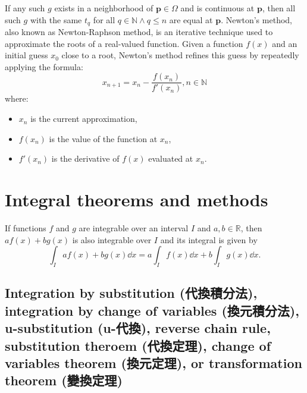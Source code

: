 \documentclass[a4paper,12pt]{report}
\begin{document}
\begin{itemize}
\begin{itemize}
If any such $g$ exists in a neighborhood of $\mathbf{p}\in\Omega$ and is continuous at $\mathbf{p}$, then all such $g$ with the same $t_q$ for all $q\in\mathbb{N}\land q\leq n$ are equal at $\mathbf{p}$.
Newton's method, also known as Newton-Raphson method, is an iterative technique used to approximate the roots of a real-valued function. Given a function $f(x)$ and an initial guess \( x_0 \) close to a root, Newton's method refines this guess by repeatedly applying the formula:
\[
x_{n+1} = x_n - \frac{f(x_n)}{f'(x_n)},n\in\mathbb{N}
\]
where:
\begin{itemize}
\item \( x_n \) is the current approximation,
\item \( f(x_n) \) is the value of the function at \( x_n \),
\item \( f'(x_n) \) is the derivative of \( f(x) \) evaluated at \( x_n \).
\end{itemize}



\section{Integral theorems and methods}
If functions $f$ and $g$ are integrable over an interval $I$ and $a,b\in\mathbb{R}$, then $af(x)+bg(x)$ is also integrable over $I$ and its integral is given by
\[\int_Iaf(x)+bg(x)\dd{x}=a\int_If(x)\dd{x}+b\int_Ig(x)\dd{x}.\]
\subsection{Integration by substitution (代換積分法), integration by change of variables (換元積分法), u-substitution (u-代換), reverse chain rule, substitution theroem (代換定理), change of variables theorem (換元定理), or transformation theorem (變換定理)}

\end{itemize}
\end{itemize}
\end{document}
